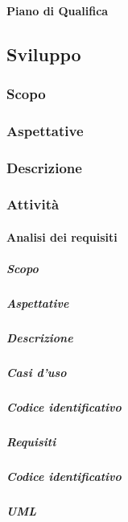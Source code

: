 		\paragraph{Piano di Qualifica}
	
\subsection{Sviluppo}
	\subsubsection{Scopo}
	\subsubsection{Aspettative}
	\subsubsection{Descrizione}
	\subsubsection{Attività}
		\paragraph{Analisi dei requisiti}
			\subparagraph{Scopo}
			\subparagraph{Aspettative}
			\subparagraph{Descrizione}
			\subparagraph{Casi d'uso}
			\subparagraph{Codice identificativo}
			\subparagraph{Requisiti}
			\subparagraph{Codice identificativo}
			\subparagraph{UML}
			
			
